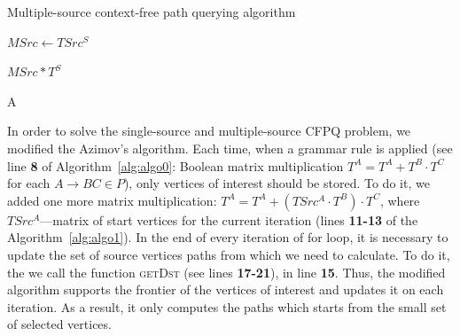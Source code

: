 \begin{algorithm}
\small
\begin{algorithmic}[1]
\caption{Multiple-source context-free path querying algorithm}
\label{alg:algo1}


     
    \EndFor
    
    \State $MSrc \gets TSrc^S$

     
        \EndFor
    \EndFor

     
        \EndFor
    \EndWhile
    \State \Return $MSrc * T^S$
\EndFunction



    \EndFor
    \State \Return A
\EndFunction
\end{algorithmic}
\end{algorithm}

In order to solve the single-source and multiple-source CFPQ problem, we modified the Azimov's algorithm.
Each time, when a grammar rule is applied (see line \textbf{8} of Algorithm~\ref{alg:algo0}: Boolean matrix multiplication $T^A = T^A + T^B \cdot T^C$ for each $A \rightarrow BC \in P$), only vertices of interest should be stored.
To do it, we added one more matrix multiplication: $T^A = T^A + (TSrc^A \cdot T^B) \cdot T^ C$, where $TSrc^A$---matrix of start vertices for the current iteration (lines \textbf{11-13} of the Algorithm~\ref{alg:algo1}).
In the end of every iteration of for loop, it is necessary to update the set of source vertices paths from which we need to calculate.
To do it, the we call the function \textsc{getDst} (see lines \textbf{17-21}), in line \textbf{15}.
Thus, the modified algorithm supports the frontier of the vertices of interest and updates it on each iteration.
As a result, it only computes the paths which starts from the small set of selected vertices.

